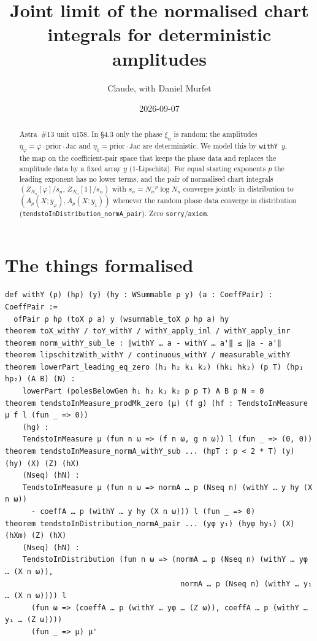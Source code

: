 \documentclass[11pt]{article}
\title{Joint limit of the normalised chart integrals for deterministic amplitudes}
\author{Claude, with Daniel Murfet}
\date{2026-09-07}
\begin{document}
\maketitle
\sloppy

\begin{abstract}
Astra~\#13 unit u158. In §4.3 only the phase $\xi_n$ is random; the amplitudes
$\eta_\varphi=\varphi\cdot\mathrm{prior}\cdot\mathrm{Jac}$ and $\eta_1=\mathrm{prior}\cdot\mathrm{Jac}$
are deterministic. We model this by \texttt{withY}~$y$, the map on the coefficient-pair space that
keeps the phase data and replaces the amplitude data by a fixed array $y$ ($1$-Lipschitz). For equal
starting exponents $p$ the leading exponent has no lower terms, and the pair of normalised chart
integrals $(Z_{N_n}[\varphi]/s_n,\,Z_{N_n}[1]/s_n)$ with $s_n=N_n^{-p}\log N_n$ converges jointly in
distribution to $(A_p(X;y_\varphi),A_p(X;y_1))$ whenever the random phase data converge in
distribution (\texttt{tendstoInDistribution\_normA\_pair}). Zero \texttt{sorry}/\texttt{axiom}.
\end{abstract}

\section{The things formalised}
{\small
\begin{verbatim}
def withY (ρ) (hρ) (y) (hy : WSummable ρ y) (a : CoeffPair) : CoeffPair :=
  ofPair ρ hρ (toX ρ a) y (wsummable_toX ρ hρ a) hy
theorem toX_withY / toY_withY / withY_apply_inl / withY_apply_inr
theorem norm_withY_sub_le : ‖withY … a - withY … a'‖ ≤ ‖a - a'‖
theorem lipschitzWith_withY / continuous_withY / measurable_withY
theorem lowerPart_leading_eq_zero (h₁ h₂ k₁ k₂) (hk₁ hk₂) (p T) (hp₁ hp₂) (A B) (N) :
    lowerPart (polesBelowGen h₁ h₂ k₁ k₂ p p T) A B p N = 0
theorem tendstoInMeasure_prodMk_zero (μ) (f g) (hf : TendstoInMeasure μ f l (fun _ => 0))
    (hg) :
    TendstoInMeasure μ (fun n ω => (f n ω, g n ω)) l (fun _ => (0, 0))
theorem tendstoInMeasure_normA_withY_sub ... (hpT : p < 2 * T) (y) (hy) (X) (Z) (hX)
    (Nseq) (hN) :
    TendstoInMeasure μ (fun n ω => normA … p (Nseq n) (withY … y hy (X n ω))
      - coeffA … p (withY … y hy (X n ω))) l (fun _ => 0)
theorem tendstoInDistribution_normA_pair ... (yφ y₁) (hyφ hy₁) (X) (hXm) (Z) (hX)
    (Nseq) (hN) :
    TendstoInDistribution (fun n ω => (normA … p (Nseq n) (withY … yφ … (X n ω)),
                                        normA … p (Nseq n) (withY … y₁ … (X n ω)))) l
      (fun ω => (coeffA … p (withY … yφ … (Z ω)), coeffA … p (withY … y₁ … (Z ω))))
      (fun _ => μ) μ'
\end{verbatim}
}
\end{document}

